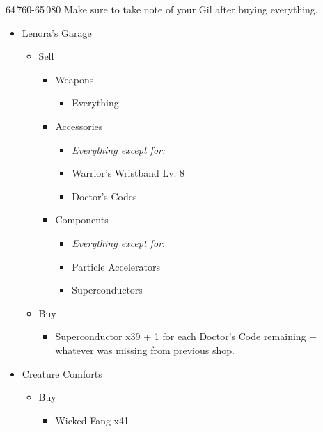 	\begin{shop}{64\,760-65\,080}
		Make sure to take note of your Gil after buying everything.
		\begin{itemize}
			\item Lenora's Garage
			      \begin{itemize}
				      \item Sell
				            \begin{itemize}
					            \item Weapons
					                  \begin{itemize}
						                  \item Everything
					                  \end{itemize}
					            \item Accessories
					                  \begin{itemize}
						                  \item \textit{Everything except for:}
						                  \item Warrior's Wristband Lv. 8
						                  \item Doctor's Codes
					                  \end{itemize}
					            \item Components
					                  \begin{itemize}
						                  \item \textit{Everything except for}:
						                  \item Particle Accelerators
						                  \item Superconductors
					                  \end{itemize}
				            \end{itemize}
				      \item Buy
				            \begin{itemize}
					            \item Superconductor x39 + 1 for each Doctor's Code remaining + whatever was missing from previous shop.
				            \end{itemize}
			      \end{itemize}
			\item Creature Comforts
			      \begin{itemize}
				      \item Buy
				            \begin{itemize}
					            \item Wicked Fang x41

\end{itemize}
\end{itemize}
\end{itemize}
\end{shop}
